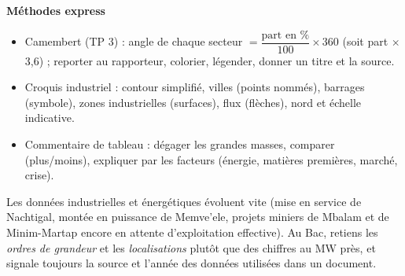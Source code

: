 \documentclass[11pt]{article}
\newcommand{\cle}[1]{{\popxbold\color{popdark}#1}}
\begin{document}
\begin{aretenir}
\textbf{Méthodes express}
\begin{itemize}
  \item \cle{Camembert (TP 3)} : angle de chaque secteur $= \dfrac{\text{part en \%}}{100}\times 360$ (soit part $\times$ 3,6) ; reporter au rapporteur, colorier, légender, donner un titre et la source.
  \item \cle{Croquis industriel} : contour simplifié, villes (points nommés), barrages (symbole), zones industrielles (surfaces), flux (flèches), nord et échelle indicative.
  \item \cle{Commentaire de tableau} : dégager les grandes masses, comparer (plus/moins), expliquer par les facteurs (énergie, matières premières, marché, crise).
\end{itemize}
\end{aretenir}

\begin{attention}
Les données industrielles et énergétiques évoluent vite (mise en service de Nachtigal, montée en puissance de Memve'ele, projets miniers de Mbalam et de Minim-Martap encore en attente d'exploitation effective). Au Bac, retiens les \emph{ordres de grandeur} et les \emph{localisations} plutôt que des chiffres au MW près, et signale toujours la source et l'année des données utilisées dans un document.
\end{attention}
\end{document}
